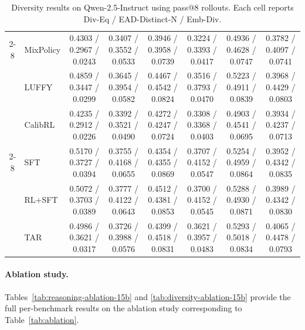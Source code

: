 \documentclass[11pt]{article}
\newcommand{\model}{\textsc{TAR}\xspace}
\begin{document}
\begin{table}[t]
{\begin{tabular}{clcccccc}
\cmidrule(lr){2-8}

& MixPolicy
& 0.4303 / 0.2967 / 0.0243
& 0.3407 / 0.3552 / 0.0533
& 0.3946 / 0.3958 / 0.0739
& 0.3224 / 0.3393 / 0.0417
& 0.4936 / 0.4628 / 0.0747
& 0.3782 / 0.4097 / 0.0741
\\

& LUFFY
& 0.4859 / 0.3447 / 0.0299
& 0.3645 / 0.3954 / 0.0582
& 0.4467 / 0.4542 / 0.0824
& 0.3516 / 0.3793 / 0.0470
& 0.5223 / 0.4911 / 0.0839
& 0.3968 / 0.4429 / 0.0803
\\

& CalibRL
& 0.4235 / 0.2912 / 0.0226
& 0.3392 / 0.3521 / 0.0490
& 0.4272 / 0.4247 / 0.0724
& 0.3308 / 0.3368 / 0.0403
& 0.4903 / 0.4541 / 0.0695
& 0.3934 / 0.4237 / 0.0713
\\

\cmidrule(lr){2-8}

& SFT
& 0.5170 / 0.3727 / 0.0394
& 0.3755 / 0.4168 / 0.0655
& 0.4354 / 0.4355 / 0.0869
& 0.3707 / 0.4152 / 0.0547
& 0.5254 / 0.4959 / 0.0864
& 0.3952 / 0.4342 / 0.0835
\\

& RL+SFT
& 0.5072 / 0.3703 / 0.0389
& 0.3777 / 0.4122 / 0.0643
& 0.4512 / 0.4381 / 0.0853
& 0.3700 / 0.4152 / 0.0545
& 0.5288 / 0.4930 / 0.0871
& 0.3989 / 0.4342 / 0.0830
\\

& \model
& 0.4986 / 0.3621 / 0.0317
& 0.3726 / 0.3988 / 0.0576
& 0.4399 / 0.4518 / 0.0831
& 0.3621 / 0.3957 / 0.0483
& 0.5293 / 0.5018 / 0.0834
& 0.4065 / 0.4478 / 0.0793
\\

\bottomrule
\end{tabular}%
}
\caption{
Diversity results on Qwen-2.5-Instruct using pass@8 rollouts.
Each cell reports Div-Eq / EAD-Distinct-N / Emb-Div.
}
\label{tab:diversity-main}

\end{table}

\paragraph{Ablation study.} Tables~\ref{tab:reasoning-ablation-15b} and \ref{tab:diversity-ablation-15b} provide the full per-benchmark results on the ablation study corresponding to Table~\ref{tab:ablation}.
\end{document}
